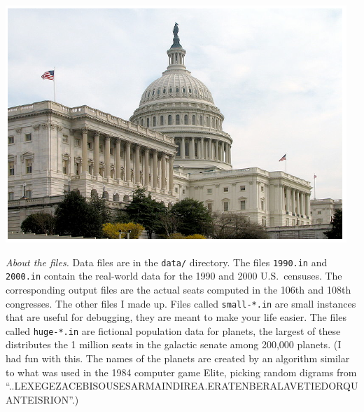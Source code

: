 \documentclass[9pt]{memoir}
\begin{document}
\begin{multicols}{2}

\noindent
\includegraphics[width=\columnwidth]{congressphoto.pdf}



\end{multicols}

\noindent
\emph{About the files.}
Data files are in the \texttt{data/} directory.
The files \texttt{1990.in} and \texttt{2000.in} contain the real-world data
for the 1990 and 2000 U.S.\ censuses.
The corresponding output files are the actual seats computed in the
106th and 108th congresses.
The other files I made up.
Files called \texttt{small-*.in} are small instances that are useful for
debugging, they are meant to make your life easier.
The files called \texttt{huge-*.in} are fictional population data for
planets, the largest of these distributes the 1 million seats in the
galactic senate among 200,000 planets.
(I had fun with this.
The names of the planets are created by an algorithm similar to what
was used in the 1984 computer game Elite, picking random digrams from
``..LEXEGEZACEBISOUSESARMAINDIREA.ERATENBERALAVETIEDORQUANTEISRION''.)
\end{document}
